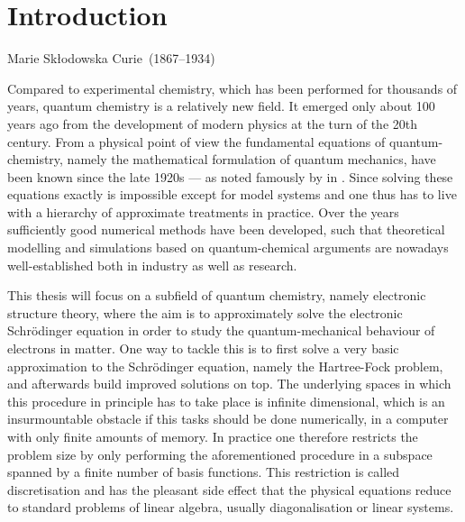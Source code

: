\chapter{Introduction}
{Marie Skłodowska Curie~(1867--1934)}

\noindent
Compared to experimental chemistry,
which has been performed for thousands of years,
quantum chemistry is a relatively new field.
It emerged only about 100 years ago from the development of modern physics
at the turn of the 20th century.
From a physical point of view the fundamental equations of quantum-chemistry,
namely the mathematical formulation of quantum mechanics,
have been known since the late 1920s
--- as noted famously by \citet{Dirac1929} in \citeyear{Dirac1929}.
Since solving these equations exactly is impossible except for model systems
and one thus has to live with a hierarchy of approximate treatments in practice.
Over the years sufficiently good numerical methods have been developed,
such that theoretical modelling and simulations
based on quantum-chemical arguments
are nowadays well-established both in industry as well as research.

This thesis will focus on a subfield of quantum chemistry,
namely electronic structure theory,
where the aim is to approximately solve the
electronic Schrödinger equation in order to study
the quantum-mechanical behaviour of electrons in matter.
One way to tackle this is to first solve
a very basic approximation to the Schrödinger equation,
namely the Hartree-Fock problem,
and afterwards build improved solutions on top.
The underlying spaces in which this procedure in principle
has to take place is infinite dimensional,
which is an insurmountable obstacle
if this tasks should be done numerically,
\ie in a computer with only finite amounts of memory.
In practice one therefore restricts the problem size
by only performing the aforementioned procedure
in a subspace spanned by a finite number of basis functions.
This restriction is called discretisation
and has the pleasant side effect that the physical equations
reduce to standard problems of linear algebra,
usually diagonalisation or linear systems.


